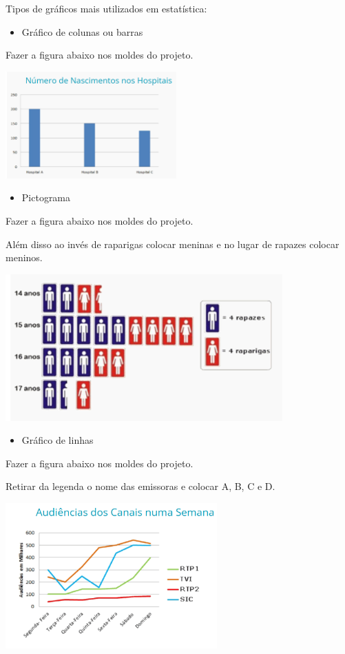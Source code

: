 Tipos de gráficos mais utilizados em estatística:

\begin{itemize}
\item
  Gráfico de colunas ou barras
\end{itemize}

Fazer a figura abaixo nos moldes do projeto.

\includegraphics[width=2.58333in,height=1.61458in]{media/image91.png}

\begin{itemize}
\item
  Pictograma
\end{itemize}

Fazer a figura abaixo nos moldes do projeto.

Além disso ao invés de raparigas colocar meninas e no lugar de rapazes
colocar meninos.

\includegraphics[width=4.18370in,height=2.21686in]{media/image92.png}

\begin{itemize}
\item
  Gráfico de linhas
\end{itemize}

Fazer a figura abaixo nos moldes do projeto.

Retirar da legenda o nome das emissoras e colocar A, B, C e D.

\includegraphics[width=3.19872in,height=2.19483in]{media/image93.png}

